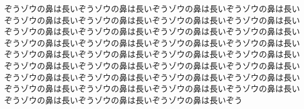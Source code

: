 ぞうゾウの鼻は長いぞうゾウの鼻は長いぞうゾウの鼻は長いぞうゾウの鼻は長いぞうゾウの鼻は長いぞうゾウの鼻は長いぞうゾウの鼻は長いぞうゾウの鼻は長いぞうゾウの鼻は長いぞうゾウの鼻は長いぞうゾウの鼻は長いぞうゾウの鼻は長いぞうゾウの鼻は長いぞうゾウの鼻は長いぞうゾウの鼻は長いぞうゾウの鼻は長いぞうゾウの鼻は長いぞうゾウの鼻は長いぞうゾウの鼻は長いぞうゾウの鼻は長いぞうゾウの鼻は長いぞうゾウの鼻は長いぞうゾウの鼻は長いぞうゾウの鼻は長いぞうゾウの鼻は長いぞうゾウの鼻は長いぞうゾウの鼻は長いぞうゾウの鼻は長いぞうゾウの鼻は長いぞうゾウの鼻は長いぞうゾウの鼻は長いぞうゾウの鼻は長いぞうゾウの鼻は長いぞうゾウの鼻は長いぞうゾウの鼻は長いぞう
